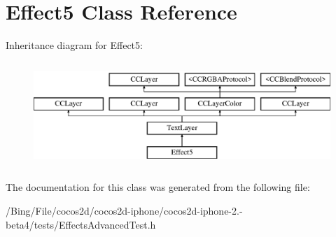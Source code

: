\hypertarget{interface_effect5}{\section{Effect5 Class Reference}
\label{interface_effect5}
}
Inheritance diagram for Effect5\-:\begin{figure}[H]
\begin{center}
\leavevmode
\includegraphics[height=4.000000cm]{interface_effect5}
\end{center}
\end{figure}


The documentation for this class was generated from the following file\-:\begin{DoxyCompactItemize}
\item 
/\-Bing/\-File/cocos2d/cocos2d-\/iphone/cocos2d-\/iphone-\/2.-\/beta4/tests/Effects\-Advanced\-Test.\-h\end{DoxyCompactItemize}
